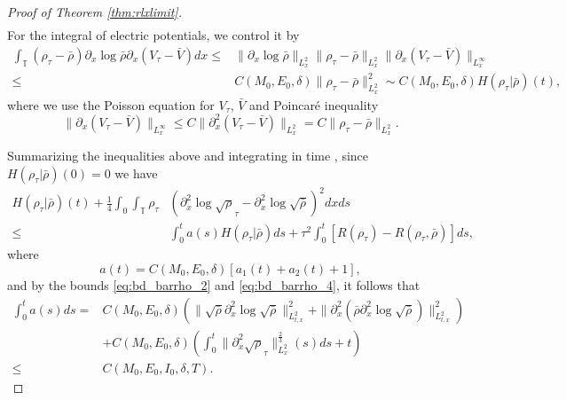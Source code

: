 \documentclass[leqno]{amsart}
\theoremstyle{plain}
\theoremstyle{definition}
\theoremstyle{remark}
\theoremstyle{plain}
\theoremstyle{plain}
\def\T{{\mathbb T}}%
\def\d{{\partial}}
\numberwithin{equation}{section}
\begin{document}
\begin{proof}[Proof of Theorem \ref{thm:rlxlimit}]
\begin{align*}
\end{align*}
For the integral of electric potentials, we control it by
\begin{align*}
\int_\T(\rho_\tau-\bar\rho)\d_x\log\bar\rho\d_x(V_\tau-\bar V)dx\leq & \|\d_x\log\bar\rho\|_{L^2_x}\|\rho_\tau-\bar\rho\|_{L^2_x}\|\d_x(V_\tau-\bar V)\|_{L^\infty_x}\\
\leq& C(M_0,E_0,\delta)\|\rho_\tau-\bar\rho\|_{L^2_x}^2\sim C(M_0,E_0,\delta)H(\rho_\tau|\bar\rho)(t),
\end{align*}
where we use the Poisson equation for $V_\tau$, $\bar V$ and Poincar\'e inequality
\[
\|\d_x(V_\tau-\bar V)\|_{L^\infty_x}\leq C\|\d_x^2(V_\tau-\bar V)\|_{L^2_x}=C\|\rho_\tau-\bar\rho\|_{L^2_x}.
\]

Summarizing the inequalities above and integrating in time , since $H(\rho_\tau|\bar\rho)(0)=0$ we have
\begin{align*}
H(\rho_\tau|\bar\rho)(t)+\frac14\int_0\int_\T\rho_\tau &(\d_x^2\log\sqrt\rho_\tau-\d_x^2\log\sqrt{\bar\rho})^2dxds\\
\leq & \int_0^t a(s)H(\rho_\tau|\bar\rho)ds+\tau^2\int_0^t[R(\rho_\tau)-R(\rho_\tau,\bar\rho)]ds,
\end{align*}
where
\[
a(t)=C(M_0,E_0,\delta)[a_1(t)+a_2(t)+1],
\]
and by the bounds \eqref{eq:bd_barrho_2} and \eqref{eq:bd_barrho_4}, it follows that
\begin{align*}
\int_0^t a(s)ds=& C(M_0,E_0,\delta)\left(\|\sqrt{\bar\rho}\d_x^2\log\sqrt{\bar\rho}\|_{L^2_{t,x}}^2+\|\d_x^2(\bar\rho\d_x^2\log\sqrt{\bar\rho})\|_{L^2_{t,x}}^2\right)\\
&+C(M_0,E_0,\delta)\left(\int_0^t \|\d_x^2\sqrt\rho_\tau\|_{L^2_x}^\frac23(s)ds+t\right)\\
\leq & C(M_0,E_0,I_0,\delta,T).
\end{align*}


\end{proof}
\end{document}
